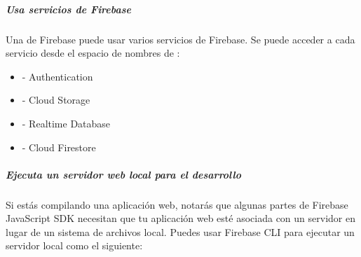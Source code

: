 %
\begin{sphinxVerbatim}[commandchars=\\\{\}]
  
           
   
   
   
   
   
\end{sphinxVerbatim}


\subparagraph{Usa servicios de Firebase}
\label{\detokenize{firebase_web:usa-servicios-de-firebase}}
Una  de Firebase puede usar varios servicios de Firebase. Se puede acceder
a cada servicio desde el espacio de nombres de :
\begin{itemize}
\item {} 
 - Authentication

\item {} 
 - Cloud Storage

\item {} 
 - Realtime Database

\item {} 
 - Cloud Firestore

\end{itemize}


\subparagraph{Ejecuta un servidor web local para el desarrollo}
\label{\detokenize{firebase_web:ejecuta-un-servidor-web-local-para-el-desarrollo}}
Si estás compilando una aplicación web, notarás que algunas partes de Firebase JavaScript SDK necesitan que tu aplicación web esté asociada con un servidor en lugar de un sistema de archivos local. Puedes usar Firebase CLI para ejecutar un servidor local como el siguiente:

